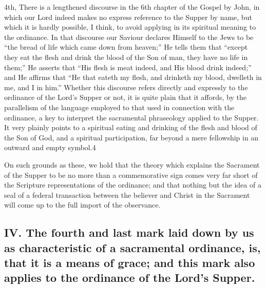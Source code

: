 \documentclass[]{book}
\begin{document}
4th, There is a lengthened discourse in the 6th chapter of the Gospel by John, in which our Lord indeed makes no express reference to the Supper by name, but which it is hardly possible, I think, to avoid applying in its spiritual meaning to the ordinance. In that discourse our Saviour declares Himself to the Jews to be ``the bread of life which came down from heaven;'' He tells them that ``except they eat the flesh and drink the blood of the Son of man, they have no life in them;'' He asserts that ``His flesh is meat indeed, and His blood drink indeed;'' and He affirms that ``He that eateth my flesh, and drinketh my blood, dwelleth in me, and I in him.'' Whether this discourse refers directly and expressly to the ordinance of the Lord's Supper or not, it is quite plain that it affords, by the parallelism of the language employed to that used in connection with the ordinance, a key to interpret the sacramental phraseology applied to the Supper. It very plainly points to a spiritual eating and drinking of the flesh and blood of the Son of God, and a spiritual participation, far beyond a mere fellowship in an outward and empty symbol.4

On such grounds as these, we hold that the theory which explains the Sacrament of the Supper to be no more than a commemorative sign comes very far short of the Scripture representations of the ordinance; and that nothing but the idea of a seal of a federal transaction between the believer and Christ in the Sacrament will come up to the full import of the observance.

\hypertarget{iv.-the-fourth-and-last-mark-laid-down-by-us-as-characteristic-of-a-sacramental-ordinance-is-that-it-is-a-means-of-grace-and-this-mark-also-applies-to-the-ordinance-of-the-lords-supper.}{%
\subsection{IV. The fourth and last mark laid down by us as characteristic of a sacramental ordinance, is, that it is a means of grace; and this mark also applies to the ordinance of the Lord's Supper.}\label{iv.-the-fourth-and-last-mark-laid-down-by-us-as-characteristic-of-a-sacramental-ordinance-is-that-it-is-a-means-of-grace-and-this-mark-also-applies-to-the-ordinance-of-the-lords-supper.}}
\end{document}
